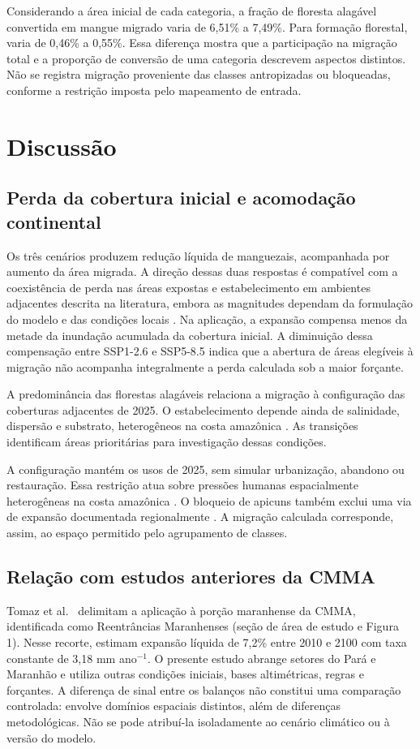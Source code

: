 \documentclass[12pt,a4paper]{article}
\begin{document}
Considerando a área inicial de cada categoria, a fração de floresta alagável convertida em mangue migrado varia de 6,51\% a 7,49\%. Para formação florestal, varia de 0,46\% a 0,55\%. Essa diferença mostra que a participação na migração total e a proporção de conversão de uma categoria descrevem aspectos distintos. Não se registra migração proveniente das classes antropizadas ou bloqueadas, conforme a restrição imposta pelo mapeamento de entrada.

\section{Discussão}
\subsection{Perda da cobertura inicial e acomodação continental}
Os três cenários produzem redução líquida de manguezais, acompanhada por aumento da área migrada. A direção dessas duas respostas é compatível com a coexistência de perda nas áreas expostas e estabelecimento em ambientes adjacentes descrita na literatura, embora as magnitudes dependam da formulação do modelo e das condições locais \citep{schuerch2018,woodroffe2016}. Na aplicação, a expansão compensa menos da metade da inundação acumulada da cobertura inicial. A diminuição dessa compensação entre SSP1-2.6 e SSP5-8.5 indica que a abertura de áreas elegíveis à migração não acompanha integralmente a perda calculada sob a maior forçante.

A predominância das florestas alagáveis relaciona a migração à configuração das coberturas adjacentes de 2025. O estabelecimento depende ainda de salinidade, dispersão e substrato, heterogêneos na costa amazônica \citep{menezes2008}. As transições identificam áreas prioritárias para investigação dessas condições.

A configuração mantém os usos de 2025, sem simular urbanização, abandono ou restauração. Essa restrição atua sobre pressões humanas espacialmente heterogêneas na costa amazônica \citep{hayashi2019}. O bloqueio de apicuns também exclui uma via de expansão documentada regionalmente \citep{menezes2008}. A migração calculada corresponde, assim, ao espaço permitido pelo agrupamento de classes.

\subsection{Relação com estudos anteriores da CMMA}
Tomaz et al.\ \citeyearpar{tomaz2019} delimitam a aplicação à porção maranhense da CMMA, identificada como Reentrâncias Maranhenses (seção de área de estudo e Figura 1). Nesse recorte, estimam expansão líquida de 7,2\% entre 2010 e 2100 com taxa constante de 3,18 mm ano$^{-1}$. O presente estudo abrange setores do Pará e Maranhão e utiliza outras condições iniciais, bases altimétricas, regras e forçantes. A diferença de sinal entre os balanços não constitui uma comparação controlada: envolve domínios espaciais distintos, além de diferenças metodológicas. Não se pode atribuí-la isoladamente ao cenário climático ou à versão do modelo.
\end{document}
